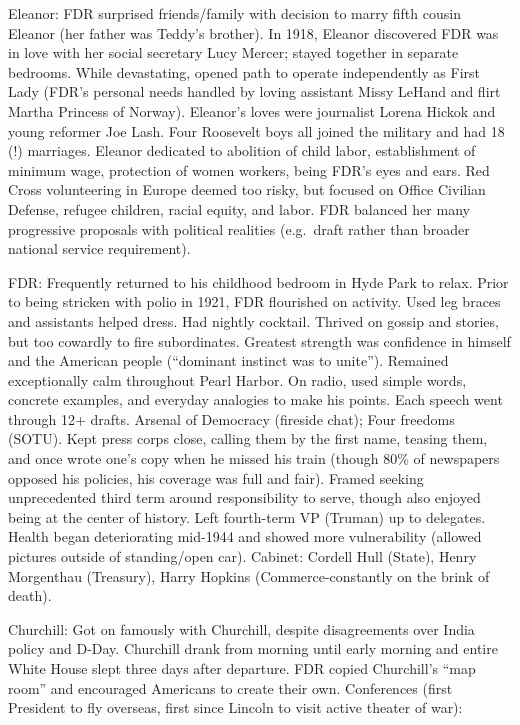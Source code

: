 \documentclass[
]{article}
\begin{document}
Eleanor: FDR surprised friends/family with decision to marry fifth
cousin Eleanor (her father was Teddy's brother). In 1918, Eleanor
discovered FDR was in love with her social secretary Lucy Mercer; stayed
together in separate bedrooms. While devastating, opened path to operate
independently as First Lady (FDR's personal needs handled by loving
assistant Missy LeHand and flirt Martha Princess of Norway). Eleanor's
loves were journalist Lorena Hickok and young reformer Joe Lash. Four
Roosevelt boys all joined the military and had 18 (!) marriages. Eleanor
dedicated to abolition of child labor, establishment of minimum wage,
protection of women workers, being FDR's eyes and ears. Red Cross
volunteering in Europe deemed too risky, but focused on Office Civilian
Defense, refugee children, racial equity, and labor. FDR balanced her
many progressive proposals with political realities (e.g.~draft rather
than broader national service requirement).

FDR: Frequently returned to his childhood bedroom in Hyde Park to relax.
Prior to being stricken with polio in 1921, FDR flourished on activity.
Used leg braces and assistants helped dress. Had nightly cocktail.
Thrived on gossip and stories, but too cowardly to fire subordinates.
Greatest strength was confidence in himself and the American people
(``dominant instinct was to unite''). Remained exceptionally calm
throughout Pearl Harbor. On radio, used simple words, concrete examples,
and everyday analogies to make his points. Each speech went through 12+
drafts. Arsenal of Democracy (fireside chat); Four freedoms (SOTU). Kept
press corps close, calling them by the first name, teasing them, and
once wrote one's copy when he missed his train (though 80\% of
newspapers opposed his policies, his coverage was full and fair). Framed
seeking unprecedented third term around responsibility to serve, though
also enjoyed being at the center of history. Left fourth-term VP
(Truman) up to delegates. Health began deteriorating mid-1944 and showed
more vulnerability (allowed pictures outside of standing/open car).
Cabinet: Cordell Hull (State), Henry Morgenthau (Treasury), Harry
Hopkins (Commerce-constantly on the brink of death).

Churchill: Got on famously with Churchill, despite disagreements over
India policy and D-Day. Churchill drank from morning until early morning
and entire White House slept three days after departure. FDR copied
Churchill's ``map room'' and encouraged Americans to create their own.
Conferences (first President to fly overseas, first since Lincoln to
visit active theater of war):
\end{document}
